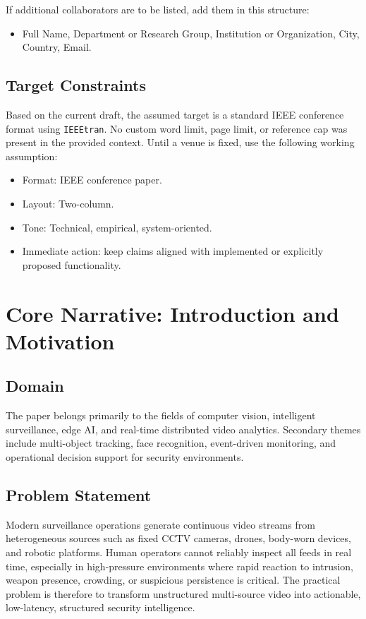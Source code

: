 \documentclass[11pt]{article}
\begin{document}
If additional collaborators are to be listed, add them in this structure:

\begin{itemize}
\item Full Name, Department or Research Group, Institution or Organization, City, Country, Email.
\end{itemize}

\subsection{Target Constraints}
Based on the current draft, the assumed target is a standard IEEE conference format using \texttt{IEEEtran}. No custom word limit, page limit, or reference cap was present in the provided context. Until a venue is fixed, use the following working assumption:

\begin{itemize}
\item Format: IEEE conference paper.
\item Layout: Two-column.
\item Tone: Technical, empirical, system-oriented.
\item Immediate action: keep claims aligned with implemented or explicitly proposed functionality.
\end{itemize}

\section{Core Narrative: Introduction and Motivation}

\subsection{Domain}
The paper belongs primarily to the fields of computer vision, intelligent surveillance, edge AI, and real-time distributed video analytics. Secondary themes include multi-object tracking, face recognition, event-driven monitoring, and operational decision support for security environments.

\subsection{Problem Statement}
Modern surveillance operations generate continuous video streams from heterogeneous sources such as fixed CCTV cameras, drones, body-worn devices, and robotic platforms. Human operators cannot reliably inspect all feeds in real time, especially in high-pressure environments where rapid reaction to intrusion, weapon presence, crowding, or suspicious persistence is critical. The practical problem is therefore to transform unstructured multi-source video into actionable, low-latency, structured security intelligence.
\end{document}
